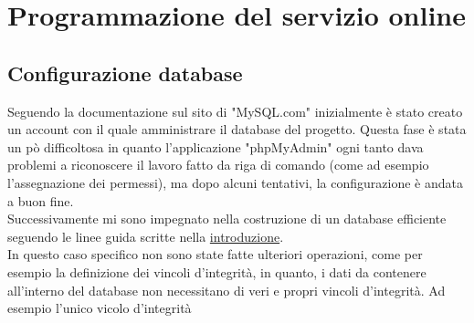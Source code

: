 \chapter{Programmazione del servizio online}\label{cap:Programmazione del servizio online}

\section{Configurazione database}\label{sez:Configurazione database}

Seguendo la documentazione sul sito di "MySQL.com" inizialmente è stato creato un account con il quale amministrare il database del progetto. Questa fase è stata un pò difficoltosa in quanto l'applicazione "phpMyAdmin" ogni tanto dava  problemi a riconoscere il lavoro fatto da riga di comando (come ad esempio l'assegnazione dei permessi), ma dopo alcuni tentativi, la configurazione è andata a buon fine.\\
Successivamente mi sono impegnato nella costruzione di un database efficiente seguendo le linee guida scritte nella \hyperref[cap:Introduzione]{introduzione}.\\
In questo caso specifico non sono state fatte ulteriori operazioni, come per esempio la definizione dei vincoli d'integrità, in quanto, i dati da contenere all'interno del database non necessitano di veri e propri vincoli d'integrità. Ad esempio l'unico vicolo d'integrità 